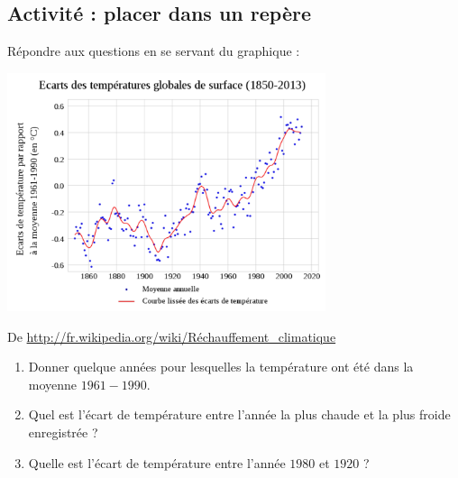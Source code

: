 
\subsection*{Activité : placer dans un repère}

Répondre aux questions en se servant du graphique :

\includegraphics[width=0.7\textwidth]{EcartsTempSurface2013.pdf}

De \url{http://fr.wikipedia.org/wiki/Réchauffement_climatique}


\begin{enumerate}
    \item
        Donner quelque années pour lesquelles la température ont été dans la moyenne \( 1961-1990\).
    \item
        Quel est l'écart de température entre l'année la plus chaude et la plus froide enregistrée ?
    \item
        Quelle est l'écart de température entre l'année \( 1980\) et \( 1920\) ?
\end{enumerate}
